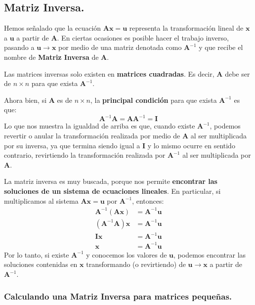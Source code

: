 \documentclass[12pt]{article}
\begin{document}
\subsection{Matriz Inversa.}

Hemos señalado que la ecuación $\mathbf{A}\mathbf{x} = \mathbf{u}$ representa la transformación lineal de $\mathbf{x}$ a $\mathbf{u}$ a partir de $\mathbf{A}$. En ciertas ocasiones es posible hacer el trabajo inverso, pasando a $\mathbf{u} \to \mathbf{x}$ por medio de una matriz denotada como $\mathbf{A}^{-1}$ y que recibe el nombre de \textbf{Matriz Inversa} de $\mathbf{A}$.

Las matrices inversas solo existen en \textbf{matrices cuadradas}. Es decir, $\mathbf{A}$ debe ser de $n \times n$ para que exista $\mathbf{A}^{-1}$.

Ahora bien, si $\mathbf{A}$ es de $n \times n$, la \textbf{principal condición} para que exista $\mathbf{A}^{-1}$ es que:
\[
  \mathbf{A}^{-1}\mathbf{A} = \mathbf{A}\mathbf{A}^{-1} = \mathbf{I}
\]
Lo que nos muestra la igualdad de arriba es que, cuando existe $\mathbf{A}^{-1}$, podemos revertir o anular la transformación realizada por medio de $\mathbf{A}$ al ser multiplicada por su inversa, ya que termina siendo igual a $\mathbf{I}$ y lo mismo ocurre en sentido contrario, revirtiendo la transformación realizada por $\mathbf{A}^{-1}$ al ser multiplicada por $\mathbf{A}$.

La matriz inversa es muy buscada, porque nos permite \textbf{encontrar las soluciones de un sistema de ecuaciones lineales}. En particular, si multiplicamos al sistema $\mathbf{A}\mathbf{x} = \mathbf{u}$ por $\mathbf{A}^{-1}$, entonces:
\begin{align*}
\mathbf{A}^{-1}(\mathbf{A}\mathbf{x}) &= \mathbf{A}^{-1}\mathbf{u} \\
(\mathbf{A}^{-1}\mathbf{A})\mathbf{x} &= \mathbf{A}^{-1}\mathbf{u} \\
\mathbf{I}\mathbf{x} &= \mathbf{A}^{-1}\mathbf{u} \\
\mathbf{x} &= \mathbf{A}^{-1}\mathbf{u}
\end{align*}
Por lo tanto, si existe $\mathbf{A}^{-1}$ y conocemos los valores de $\mathbf{u}$, podemos encontrar las soluciones contenidas en $\mathbf{x}$ transformando (o revirtiendo) de $\mathbf{u} \to \mathbf{x}$ a partir de $\mathbf{A}^{-1}$.

\subsubsection{Calculando una Matriz Inversa para matrices pequeñas.}
\end{document}
